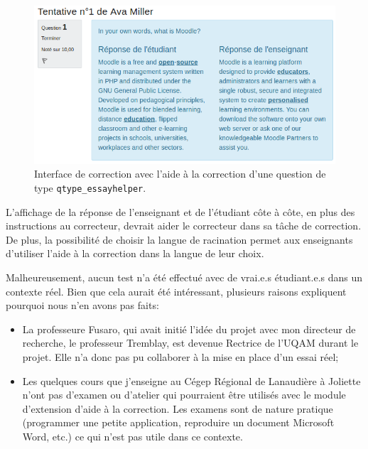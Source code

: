 \begin{figure}[htbp]
  \includegraphics[scale=0.85]{images/questionform_correction.png}
  \caption{Interface de correction avec l'aide \`a la correction d'une question de type \texttt{qtype\_essayhelper}.}
  \label{questionform_correction}
\end{figure}

L'affichage de la r\'eponse de l'enseignant et de l'\'etudiant c\^ote \`a c\^ote, en plus des instructions au correcteur, devrait aider le correcteur dans sa t\^ache de correction.
De plus, la possibilit\'e de choisir la langue de racination permet aux enseignants d'utiliser l'aide \`a la correction dans la langue de leur choix.

Malheureusement, aucun test n'a \'et\'e effectu\'e avec de vrai.e.s
\'etudiant.e.s dans un contexte r\'eel.  Bien que cela aurait \'et\'e
int\'eressant, plusieurs raisons expliquent pourquoi nous n'en avons
pas faits:
\begin{itemize}
  \item La professeure Fusaro, qui avait initi\'e l'id\'ee du projet avec mon directeur de recherche, le professeur Tremblay, est devenue Rectrice de l'UQAM durant le projet. Elle n'a donc pas pu collaborer \`a la mise en place d'un essai r\'eel;
  \item Les quelques cours que j'enseigne au C\'egep R\'egional de Lanaudi\`ere \`a Joliette n'ont pas d'examen ou d'atelier qui pourraient \^etre utilis\'es avec le module d'extension d'aide \`a la correction.
    Les examens sont de nature pratique (programmer une petite application, reproduire un document Microsoft Word, etc.) ce qui n'est pas utile dans ce contexte.
\end{itemize}

